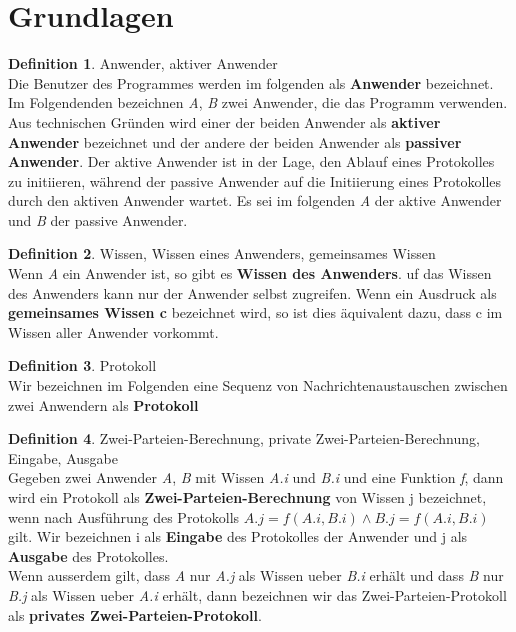 \documentclass{article}
\newcommand{\defined}[1]{{\bf #1}}
\newcommand{\var}[1]{{\em #1}}
\theoremstyle{definition}
\newtheorem{definition}{Definition}
\theoremstyle{remark}
\begin{document}
\tableofcontents

\section{Grundlagen}
\begin{definition}
Anwender, aktiver Anwender\\
Die Benutzer des Programmes werden im folgenden als \defined{Anwender} bezeichnet.
  Im Folgendenden bezeichnen \var{A}, \var{B} zwei Anwender, die das Programm 
verwenden.\\
  Aus technischen Gr\"unden wird einer der beiden Anwender als 
\defined{aktiver Anwender} bezeichnet und der andere der beiden Anwender als
\defined{passiver Anwender}. Der aktive Anwender ist in der Lage, den Ablauf
eines Protokolles zu initiieren, w\"ahrend der passive Anwender auf die 
Initiierung eines Protokolles durch den aktiven Anwender wartet. Es sei im
folgenden \var{A} der aktive Anwender und \var{B} der passive Anwender.
\end{definition}

\begin{definition}
Wissen, Wissen eines Anwenders, gemeinsames Wissen\\
Wenn \var{A} ein Anwender ist, so gibt es \defined{Wissen des Anwenders}.
uf das Wissen des Anwenders kann nur der Anwender selbst zugreifen.
Wenn ein Ausdruck als \defined{gemeinsames Wissen c} bezeichnet wird, 
so ist dies \"aquivalent dazu, dass c im Wissen aller Anwender vorkommt.
\end{definition}

\begin{definition}
Protokoll\\
Wir bezeichnen im Folgenden eine Sequenz von Nachrichtenaustauschen zwischen
zwei Anwendern als \defined{Protokoll}
\end{definition}

\begin{definition}
Zwei-Parteien-Berechnung, private Zwei-Parteien-Berechnung, Eingabe, Ausgabe\\
Gegeben zwei Anwender \var{A}, \var{B} mit Wissen \var{A.i} und \var{B.i}
und eine Funktion \var{f}, dann wird ein Protokoll als
\defined{Zwei-Parteien-Berechnung} von Wissen j bezeichnet, wenn nach 
Ausf\"uhrung des Protokolls  \(A.j = f(A.i, B.i) \wedge B.j = f(A.i, B.i) \)
gilt. Wir bezeichnen i als \defined{Eingabe} des Protokolles der Anwender
und j als \defined{Ausgabe} des Protokolles.\\
Wenn ausserdem gilt, dass \var{A} nur \var{A.j} als Wissen ueber \var{B.i}
erh\"alt und dass \var{B} nur \var{B.j} als Wissen ueber \var{A.i} erh\"alt,
dann bezeichnen wir das Zwei-Parteien-Protokoll als \defined{privates
Zwei-Parteien-Protokoll}.
\end{definition}
\end{document}
